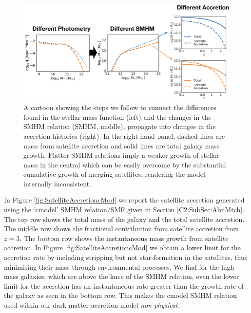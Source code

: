 \begin{figure}[h]
	\centering
	\includegraphics[width = \linewidth]{Figures/Chapter4/SMFtoAccretion.jpeg}
    \caption{A cartoon showing the steps we follow to connect the differences found in the stellar mass function (left) and the changes in the SMHM relation (SMHM, middle), propagate into changes in the accretion histories (right). In the right hand panel, dashed lines are mass from satellite accretion and solid lines are total galaxy mass growth. Flatter SMHM relations imply a weaker growth of stellar mass in the central which can be easily overcome by the substantial cumulative growth of merging satellites, rendering the model internally inconsistent.}
	\label{fig:SMFtoAcc}
\end{figure}

In Figure \ref{fig:SatelliteAccretioncMod} we report the satellite accretion generated using the `cmodel' SMHM relation/SMF given in Section \ref{C2:SubSec:AbnMtch}. 
The top row shows the total mass of the galaxy and the total satellite accretion. The middle row shows the fractional contribution from satellite accretion from $z = 3$. The bottom row shows the instantaneous mass growth from satellite accretion. In Figure \ref{fig:SatelliteAccretioncMod} we obtain a lower limit for the accretion rate by including stripping but not star-formation in the satellites, thus minimising their mass through environmental processes. We find for the high mass galaxies, which are above the knee of the SMHM relation, even the lower limit for the accretion has an instantaneous rate greater than the growth rate of the galaxy as seen in the bottom row. This makes the cmodel SMHM relation used within our dark matter accretion model \textit{non-physical}.

